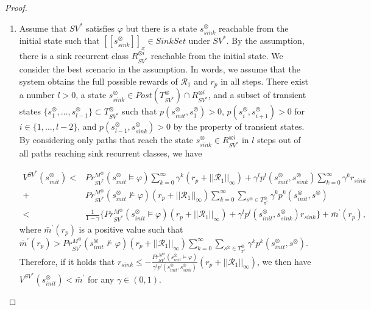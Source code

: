 \documentclass[10pt]{article}
\theoremstyle{definition}
\newcommand{\myspqsink}{\ensuremath{[\![s^{\otimes}_{sink}]\!]}_x}
\begin{document}
\begin{proof}
\begin{enumerate}
  \item Assume that $SV^{\ast}$ satisfies $\varphi$ but there is a state $s^{\otimes}_{sink}$ reachable from the initial state such that $\myspqsink \in SinkSet$ under $SV^{\ast}$. By the assumption, there is a sink recurrent class $R^{\otimes i}_{SV^{\ast}}$ reachable from the initial state. We consider the best scenario in the assumption. In words, we assume that the system obtains the full possible rewards of $\mathcal{R}_1$ and $r_p$ in all steps. There exist a number $l > 0$, a state $s^{\otimes}_{sink} \in Post(T^{\otimes}_{SV^{\ast}}) \cap R^{\otimes i}_{SV^{\ast}}$, and a subset of transient states $\{ s^{\otimes}_1, \ldots , s^{\otimes}_{l-1} \} \subset T^{\otimes}_{SV^{\ast}}$ such that $p(s^{\otimes}_{init}, s^{\otimes}_1)>0$, $p(s^{\otimes}_{i}, s^{\otimes}_{i+1})>0$ for $i \in \{ 1,...,l-2 \}$, and $p(s^{\otimes}_{l-1}, s^{\otimes}_{sink})>0$ by the property of transient states. By considering only paths that reach the state $s^{\otimes}_{sink} \in R^{\otimes i}_{SV^{\ast}}$ in $l$ steps out of all paths reaching sink recurrent classes, we have

  \begin{align}
    V^{SV^{\ast}}(s^{\otimes}_{init}) < & Pr^{M^{\otimes}}_{SV^{\ast}}(s^{\otimes}_{init} \models \varphi) \sum_{k=0}^{\infty} \gamma^k (r_p + ||\mathcal{R}_1||_{\infty}) + \gamma^l p^l(s^{\otimes}_{init}, s^{\otimes}_{sink}) \sum_{k=0}^{\infty} \gamma^k r_{sink} \nonumber \\
    + & Pr^{M^{\otimes}}_{SV^{\ast}}(s^{\otimes}_{init} \not\models \varphi) (r_p + ||\mathcal{R}_1||_{\infty}) \sum_{k=0}^{\infty} \sum_{s^{\otimes} \in T^{\otimes}_{\pi^{\ast}}} \gamma^k p^k(s^{\otimes}_{init}, s^{\otimes}) \nonumber \\
    < & \frac{1}{1-\gamma} \{ Pr^{M^{\otimes}}_{SV^{\ast}}(s^{\otimes}_{init} \models \varphi) (r_p + ||\mathcal{R}_1||_{\infty}) + \gamma^l p^l (s^{\otimes}_{init}, s^{\otimes}_{sink}) r_{sink} \} + \bar{m}^{\prime}(r_p), \nonumber
  \end{align}
  where $\bar{m}^{\prime}(r_p)$ is a positive value such that $\bar{m}^{\prime}(r_p) > Pr^{M^{\otimes}}_{SV^{\ast}}(s^{\otimes}_{init} \not\models \varphi) (r_p + ||\mathcal{R}_1||_{\infty}) \sum_{k=0}^{\infty} \sum_{s^{\otimes} \in T^{\otimes}_{\pi^{\ast}}} \gamma^k p^k(s^{\otimes}_{init}, s^{\otimes})$.
  Therefore, if it holds that $r_{sink} \leq - \frac{Pr^{M^{\otimes}}_{SV^{\ast}}(s^{\otimes}_{init} \models \varphi)}{ \gamma^l p^l (s^{\otimes}_{init}, s^{\otimes}_{sink})} (r_p + ||\mathcal{R}_1||_{\infty})$, we then have $V^{SV^{\ast}}(s^{\otimes}_{init}) < \bar{m}^{\prime}$ for any $\gamma \in (0,1)$.


\end{enumerate}
\end{proof}
\end{document}
